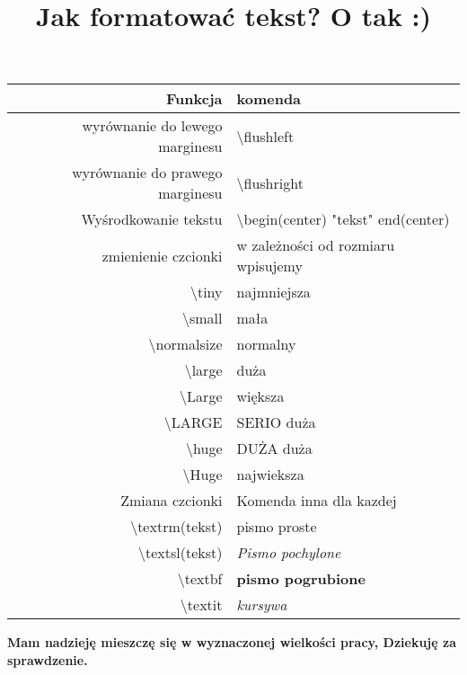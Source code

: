 \documentclass{article}
\begin{document}
\newpage
\begin{center}
\title{\textbf{Jak formatować tekst?} }
\end{center}

\begin{center}
\title{\huge O tak :)}
\maketitle
\end{center}
\begin{center}
\begin{tabular}{|r|l|}
\hline
Funkcja & komenda \\
\hline
wyrównanie do lewego marginesu & \textbackslash flushleft \\
wyrównanie do prawego marginesu & \textbackslash flushright \\
Wyśrodkowanie tekstu & \textbackslash begin(center) "tekst" end(center)\\
zmienienie czcionki & w zależności od rozmiaru wpisujemy \\
\textbackslash tiny & najmniejsza \\
\textbackslash small & mała \\
\textbackslash normalsize & normalny \\
\textbackslash large & duża \\
\textbackslash Large & większa \\
\textbackslash LARGE & SERIO duża \\
\textbackslash huge & DUŻA duża\\
\textbackslash Huge & najwieksza\\
Zmiana czcionki & Komenda inna dla kazdej \\
\textbackslash textrm(tekst) & pismo proste \\
\textbackslash textsl(tekst) & \textsl{Pismo pochylone}\\
\textbackslash textbf & \textbf{pismo pogrubione} \\
\textbackslash textit & \textit{kursywa}\\
\hline


\end{tabular}
\end{center}
\begin{center}
\textbf{Mam nadzieję mieszczę się w wyznaczonej wielkości pracy,
Dziekuję za sprawdzenie.}
\end{center}
\end{document}
